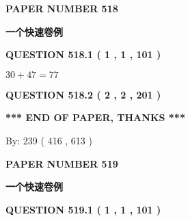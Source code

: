 \documentclass{ctexart}
\begin{document}
   
 {\textbf{ \Large{ PAPER NUMBER  518  }}}
   
   
\vspace{0.2in}
   
   
   
   
   
   
 \vspace{0.2in}
{\LARGE {\textbf{ 一个快速卷例}}}
   
   
  
\vspace{0.2in}
  
{\textbf{\Large{QUESTION
518.1 
 ( 1 , 1 , 101 )
}}}
  
  
 
 

$ %
30 +  %
47=   %
77$
 
 
  
\vspace{0.2in}
  
{\textbf{\Large{QUESTION
518.2 
 ( 2 , 2 , 201 )
}}}
  
  
   
   
 \vspace{0.2in}
 
   
   
   
   
\vspace{1.0in} 
{\textbf{\large{ *** END OF PAPER, THANKS *** }}} 
   
   
\hspace{1.0in} By: 
 239 ( 416 ,  613 )
   
   
   
   
\newpage 
\setcounter{page}{ 
   519001 } 
   
   
   
   
 {\textbf{ \Large{ PAPER NUMBER  519  }}}
   
   
\vspace{0.2in}
   
   
   
   
   
   
 \vspace{0.2in}
{\LARGE {\textbf{ 一个快速卷例}}}
   
   
  
\vspace{0.2in}
  
{\textbf{\Large{QUESTION
519.1 
 ( 1 , 1 , 101 )
}}}
  
\end{document}
